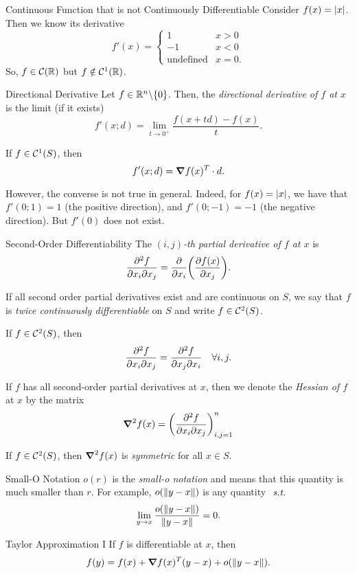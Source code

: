 \begin{eg}{Continuous Function that is not Continuously Differentiable}
	Consider $f(x)=\abs{x}$. Then we know its derivative \[f'(x)=\begin{cases}1&x>0\\-1&x<0\\\text{undefined}&x=0.\end{cases}\] So, $f\in{\mathcal{C}}({\mathbb{R}})$ but $f\notin{\mathcal{C}}^1({\mathbb{R}})$.
\end{eg}
\begin{df}{Directional Derivative}
	Let $f\in{\mathbb{R}}^n\backslash\qty{0}$. Then, the \textit{directional derivative of $f$ at $x$} is the limit (if it exists) \[f'(x;d)=\lim_{t\to0^+}\dfrac{f(x+td)-f(x)}{t}.\]
\end{df}
\begin{rmk}
	If $f\in{\mathcal{C}}^1(S)$, then \[f'(x;d)=\grad{f(x)}^T\cdot d.\]\par However, the converse is not true in general. Indeed, for $f(x)=\abs{x}$, we have that $f'(0;1)=1$ (the positive direction), and $f'(0;-1)=-1$ (the negative direction). But $f'(0)$ does not exist. 
\end{rmk}
\begin{df}{Second-Order Differentiability}
	The \textit{$(i,j)$-th partial derivative of $f$ at $x$} is \[\pdv[2]{f}{x_i}{x_j}=\pdv{x_i}\qty(\pdv{f(x)}{x_j}).\]\par If all second order partial derivatives exist and are continuous on $S$, we say that $f$ is \textit{twice continuously differentiable} on $S$ and write $f\in{\mathcal{C}}^2(S)$.\par If $f\in{\mathcal{C}}^2(S)$, then \[\pdv[2]{f}{x_i}{x_j}=\pdv[2]{f}{x_j}{x_i}\quad\forall i,j.\]\par If $f$ has all second-order partial derivatives at $x$, then we denote the \textit{Hessian of $f$} at $x$ by the matrix \[\grad^2f(x)=\mqty(\dsst\pdv[2]{f}{x_i}{x_j})_{i,j=1}^n\]\par If $f\in{\mathcal{C}}^2(S)$, then $\grad^2f(x)$ is \textit{symmetric} for all $x\in S$.
\end{df}
\begin{df}{Small-O Notation}
	$o(r)$ is the \textit{small-o notation} and means that this quantity is much smaller than $r$. For example, $o(\norm{y-x})$ is any quantity $\emph{\ s.t.\ }$\[\lim_{y\to x}\dfrac{o(\norm{y-x})}{\norm{y-x}}=0.\]
\end{df}
\begin{thm}{Taylor Approximation I}
	If $f$ is differentiable at $x$, then \[f(y)=f(x)+\grad{f(x)}^T(y-x)+o\qty(\norm{y-x}).\]
\end{thm}

